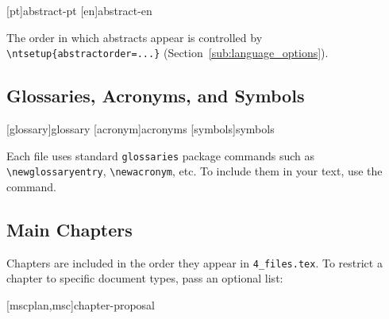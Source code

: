 \begin{latexcode}
[pt]{abstract-pt}   %
[en]{abstract-en}
\end{latexcode}

The order in which abstracts appear is controlled by
\verb!\ntsetup{abstractorder=...}! (Section~\ref{sub:language_options}).

\subsection{Glossaries, Acronyms, and Symbols}
\label{sub:glossaries}

\begin{latexcode}
[glossary]{glossary}   %
[acronym]{acronyms}
[symbols]{symbols}
\end{latexcode}

Each file uses standard \texttt{glossaries} package commands such as 
\verb!\newglossaryentry!, \verb!\newacronym!, etc. 
To include them in your text, use the  command.

\subsection{Main Chapters}
\label{sub:chapters}

\begin{latexcode}
\end{latexcode}

Chapters are included in the order they appear in \verb!4_files.tex!.
To restrict a chapter to specific document types, pass an optional list:
\begin{latexcode}
[mscplan,msc]{chapter-proposal}  %
\end{latexcode}

